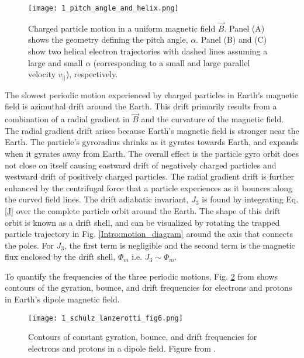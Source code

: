 \begin{figure}
\texttt{[image: 1\_pitch\_angle\_and\_helix.png]}
\caption{Charged particle motion in a uniform magnetic field $\vec{B}$. Panel (A) shows the geometry defining the pitch angle, $\alpha$. Panel (B) and (C) show two helical electron trajectories with dashed lines assuming a large and small $\alpha$ (corresponding to a small and large parallel velocity $v_{||}$), respectively.}
\label{Intro:pa}
\end{figure}

The slowest periodic motion experienced by charged particles in Earth's magnetic field is azimuthal drift around the Earth. This drift primarily results from a combination of a radial gradient in $\vec{B}$ and the curvature of the magnetic field. The radial gradient drift arises because Earth's magnetic field is stronger near the Earth. The particle's gyroradius shrinks as it gyrates towards Earth, and expands when it gyrates away from Earth. The overall effect is the particle gyro orbit does not close on itself causing eastward drift of negatively charged particles and westward drift of positively charged particles. The radial gradient drift is further enhanced by the centrifugal force that a particle experiences as it bounces along the curved field lines. The drift adiabatic invariant, $J_3$ is found by integrating Eq. \ref{J} over the complete particle orbit around the Earth. The shape of this drift orbit is known as a drift shell, and can be visualized by rotating the trapped particle trajectory in Fig. \ref{Intro:motion_diagram} around the axis that connects the poles. For $J_3$, the first term is negligible and the second term is the magnetic flux enclosed by the drift shell, $\Phi_m$  i.e. $J_3 \sim \Phi_m$.

To quantify the frequencies of the three periodic motions, Fig. \ref{Intro:adiabatic_frequencies} from \citet{Schulz1974} shows contours of the gyration, bounce, and drift frequencies for electrons and protons in Earth's dipole magnetic field. 

\begin{figure}
\texttt{[image: 1\_schulz\_lanzerotti\_fig6.png]}
\caption{Contours of constant gyration, bounce, and drift frequencies for electrons and protons in a dipole field. Figure from \citet{Schulz1974}.}
\label{Intro:adiabatic_frequencies}
\end{figure}

